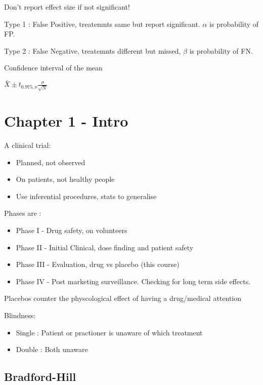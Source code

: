 \documentclass[
  letterpaper,
  DIV=11,
  numbers=noendperiod]{scrreprt}
\providecommand{\tightlist}{%
  \setlength{\itemsep}{0pt}\setlength{\parskip}{0pt}}\usepackage{longtable,booktabs,array}
\begin{document}
Don't report effect size if not significant!

Type 1 : False Positive, treatemnts same but report significant.
\(\alpha\) is probability of FP.

Type 2 : False Negative, treatemnts different but missed, \(\beta\) is
probability of FN.

Confidence interval of the mean

\(\bar{X} \pm t_{0.975, \nu} \frac{\sigma}{\sqrt{N}}\)

\hypertarget{chapter-1---intro}{%
\section{Chapter 1 - Intro}\label{chapter-1---intro}}

A clinical trial:

\begin{itemize}
\tightlist
\item
  Planned, not observed
\item
  On patients, not healthy people
\item
  Use inferential procedures, stats to generalise
\end{itemize}

Phases are :

\begin{itemize}
\tightlist
\item
  Phase I - Drug safety, on volunteers
\item
  Phase II - Initial Clinical, dose finding and patient safety
\item
  Phase III - Evaluation, drug vs placebo (this course)
\item
  Phase IV - Post marketing surveillance. Checking for long term side
  effects.
\end{itemize}

Placebos counter the physcological effect of having a drug/medical
attention

Blindness:

\begin{itemize}
\tightlist
\item
  Single : Patient or practioner is unaware of which treatment
\item
  Double : Both unaware
\end{itemize}

\hypertarget{bradford-hill}{%
\subsection{Bradford-Hill}\label{bradford-hill}}
\end{document}
